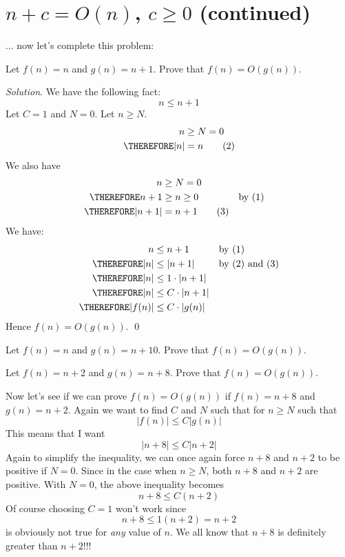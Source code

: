 \section{$n + c = O(n)$, $c \geq 0$ (continued)} 

... now let's complete this problem:

\begin{eg}
Let $f(n) = n$ and $g(n) = n + 1$.
Prove that $f(n) = O(g(n))$.
\end{eg}

\textit{Solution}.
We have the following fact:
\[
n \leq n + 1 \tag{1}
\]
Let $C = 1$ and $N = 0$.
Let $n \geq N$.
\begin{align*}
n &\geq N = 0 \\
\THEREFORE |n| &= n \tag{2}
\end{align*}
We also have
\begin{align*}
n &\geq N = 0 \\
\THEREFORE n + 1 &\geq n \geq 0 & & \text{by (1)} \\
\THEREFORE |n + 1| &= n + 1 \tag{3}
\end{align*}
We have:
\begin{align*}
n &\leq n + 1 & & \text{by (1)}\\
\THEREFORE |n| &\leq |n + 1| & & \text{by (2) and (3)}\\
\THEREFORE |n| &\leq 1 \cdot |n + 1| \\
\THEREFORE |n| &\leq C \cdot |n + 1| \\
\THEREFORE |f(n)| &\leq C \cdot |g(n)| \\
\end{align*}
Hence $f(n) = O(g(n))$. 
\qed

\begin{ex}
Let $f(n) = n$ and $g(n) = n + 10$.
Prove that $f(n) = O(g(n))$.
\end{ex}

\begin{ex}
Let $f(n) = n + 2$ and $g(n) = n + 8$.
Prove that $f(n) = O(g(n))$.
\end{ex}


Now let's see if we can prove $f(n) = O(g(n))$ if
$f(n) = n + 8$ and $g(n) = n + 2$.
Again we want to find $C$ and $N$ such that for 
$n \geq N$ such that 
\[
|f(n)| \leq C|g(n)|
\]
This means that I want
\[
|n + 8| \leq C|n + 2|
\]
Again to simplify the inequality, we can once again force $n + 8$
and $n + 2$ to be positive if $N = 0$.
Since in the case when $n \geq N$, both $n + 8$ and $n + 2$ are positive.
With $N = 0$, the above inequality becomes
\[
n + 8 \leq C(n + 2)
\]
Of course choosing $C = 1$ won't work since
\[
n + 8 \leq 1(n + 2) = n + 2
\]
is obviously not true for \textit{any} value of $n$.
We all know that $n + 8$ is definitely greater than $n + 2$!!!


